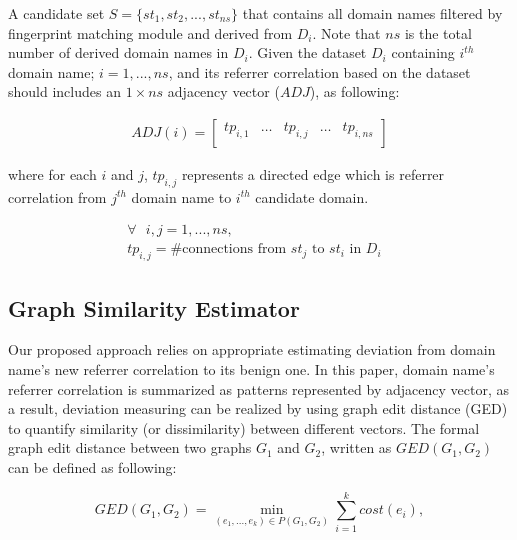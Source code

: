 A candidate set $S = \{st_1, st_2, ..., st_{ns}\}$ that contains all domain names filtered by fingerprint matching module and derived from $D_i$. Note that $ns$ is the total number of derived domain names in $D_i$. Given the dataset $D_i$ containing $i^{th}$ domain name; $i=1,...,ns$, and its referrer correlation based on the dataset should includes an $1 \times ns$ adjacency vector ($ADJ$), as following:

\begin{equation*}
\begin{split}
ADJ(i) = 
\left[
\begin{array}{ccccc}
tp_{i,1} & \ldots & tp_{i,j} & \ldots & tp_{i,ns}\\
\end{array}
\right]
\end{split}
\end{equation*}

where for each $i$ and $j$, $tp_{i,j}$ represents a directed edge which is referrer correlation from $j^{th}$ domain name to $i^{th}$ candidate domain.

\begin{equation*}
\begin{array}{ll}
\forall\mbox{ }i,j=1,...,ns, &\\ 
tp_{i,j} = \mbox{\#connections from }\mbox{$st_j$}\mbox{ to }\mbox{$st_i$}\mbox{ in }\mbox{$D_i$}			 
\end{array}
\end{equation*}

\subsection{Graph Similarity Estimator}

Our proposed approach relies on appropriate estimating deviation from domain name's new referrer correlation to its benign one. In this paper, domain name's referrer correlation is summarized as patterns represented by adjacency vector, as a result, deviation measuring can be realized by using graph edit distance (GED) to quantify similarity (or dissimilarity) between different vectors.   
The formal graph edit distance between two graphs $G_{1}$ and $G_{2}$, written as $GED(G_{1},G_{2})$ can be defined as following:

\begin{equation}
GED(G_{1},G_{2}) = \min\limits_{(e_{1},...,e_{k}) \in P(G_{1}, G_{2})}\sum\limits_{i=1}^{k}cost(e_{i}),
\label{equ:ged_idea}
\end{equation} 

